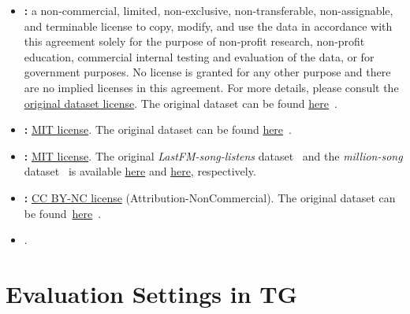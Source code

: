 \begin{itemize}[leftmargin=*]
    \item \textbf{\href{https://object-arbutus.cloud.computecanada.ca/tgb/tgbl-flight.zip}{\sky}:} a non-commercial, limited, non-exclusive, non-transferable, non-assignable, and terminable license to copy, modify, and use the data in accordance with this agreement solely for the purpose of non-profit research, non-profit education, commercial internal testing and evaluation of the data, or for government purposes. No license is granted for any other purpose and there are no implied licenses in this agreement. For more details, please consult the \href{https://zenodo.org/record/7323875}{original dataset license}. The original dataset can be found \href{https://zenodo.org/record/7323875#.ZEmhTnZKguU}{here}~\cite{strohmeier2021crowdsourced}.
    
    \item \textbf{\href{https://object-arbutus.cloud.computecanada.ca/tgb/tgbn-trade.zip}{\trade}:} \underline{MIT license}. The original dataset can be found \href{https://www.fao.org/faostat/en/#data/TM}{here}~\cite{macdonald2015rethinking}.
    
    \item \textbf{\href{https://object-arbutus.cloud.computecanada.ca/tgb/tgbn-genre.zip}{\fm}:} \underline{MIT license}. The original \textit{LastFM-song-listens} dataset~\cite{kumar2019predicting,hidasi2012fast} and the \textit{million-song} dataset~\cite{bertin2011million} is available \href{http://snap.stanford.edu/jodie/#datasets}{here} and \href{http://millionsongdataset.com/}{here}, respectively. 
    
    \item \textbf{\href{https://object-arbutus.cloud.computecanada.ca/tgb/tgbn-reddit.zip}{\subreddit}:} \underline{CC BY-NC license} (Attribution-NonCommercial). The original dataset can be found~\href{https://surfdrive.surf.nl/files/index.php/s/M09RDerAMZrQy8q}{here}~\cite{nadiri2022large}. 

    \item {}.
    
\end{itemize}



\section{Evaluation Settings in TG} \label{app:eval}

